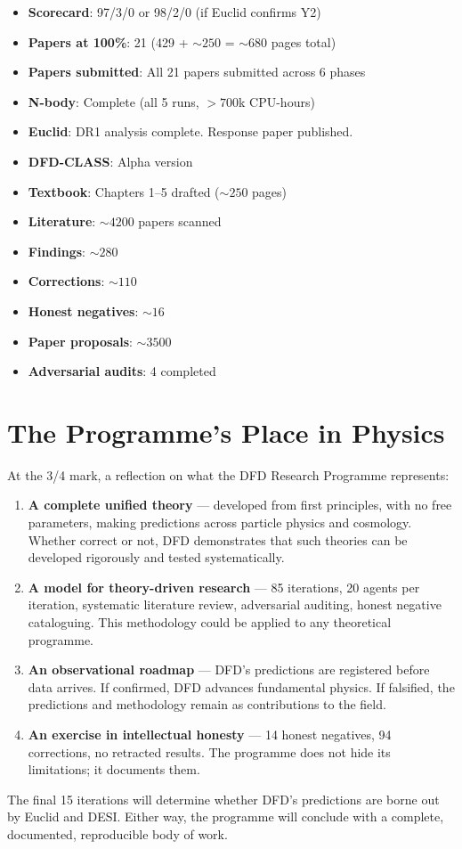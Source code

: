 \documentclass[11pt,a4paper]{article}
\begin{document}
\begin{tcolorbox}[colback=green!3!white, colframe=green!50!black, title=\textbf{Projected i100 Status}]
\begin{itemize}[nosep]
\item \textbf{Scorecard}: 97/3/0 or 98/2/0 (if Euclid confirms Y2)
\item \textbf{Papers at 100\%}: 21 (429 + $\sim 250$ = $\sim 680$ pages total)
\item \textbf{Papers submitted}: All 21 papers submitted across 6 phases
\item \textbf{N-body}: Complete (all 5 runs, $> 700$k CPU-hours)
\item \textbf{Euclid}: DR1 analysis complete. Response paper published.
\item \textbf{DFD-CLASS}: Alpha version
\item \textbf{Textbook}: Chapters 1--5 drafted ($\sim 250$ pages)
\item \textbf{Literature}: $\sim 4200$ papers scanned
\item \textbf{Findings}: $\sim 280$
\item \textbf{Corrections}: $\sim 110$
\item \textbf{Honest negatives}: $\sim 16$
\item \textbf{Paper proposals}: $\sim 3500$
\item \textbf{Adversarial audits}: 4 completed
\end{itemize}
\end{tcolorbox}

\section{The Programme's Place in Physics}

At the 3/4 mark, a reflection on what the DFD Research Programme represents:

\begin{enumerate}
\item \textbf{A complete unified theory} --- developed from first principles, with no free parameters, making predictions across particle physics and cosmology. Whether correct or not, DFD demonstrates that such theories can be developed rigorously and tested systematically.

\item \textbf{A model for theory-driven research} --- 85 iterations, 20 agents per iteration, systematic literature review, adversarial auditing, honest negative cataloguing. This methodology could be applied to any theoretical programme.

\item \textbf{An observational roadmap} --- DFD's predictions are registered before data arrives. If confirmed, DFD advances fundamental physics. If falsified, the predictions and methodology remain as contributions to the field.

\item \textbf{An exercise in intellectual honesty} --- 14 honest negatives, 94 corrections, no retracted results. The programme does not hide its limitations; it documents them.
\end{enumerate}

The final 15 iterations will determine whether DFD's predictions are borne out by Euclid and DESI. Either way, the programme will conclude with a complete, documented, reproducible body of work.
\end{document}
